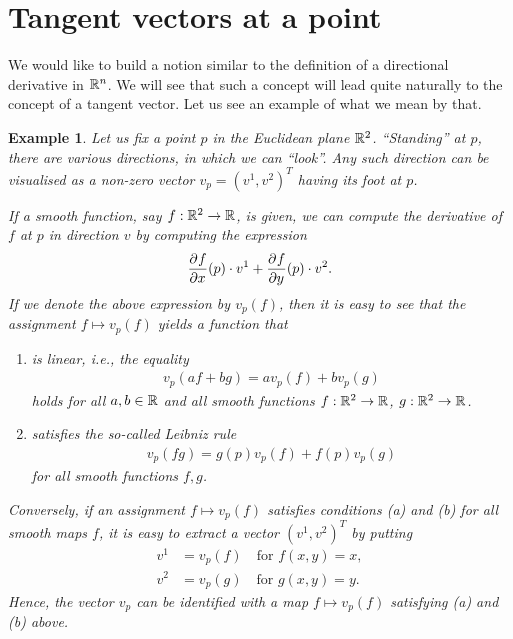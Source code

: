 \documentclass[11pt,a4paper,twoside,openany]{report}
\theoremstyle{my-theorem}
\theoremstyle{non-theorem}
\newtheorem{example}[theorem]{Example}
\begin{document}
	\section{Tangent vectors at a point}
	\label{sec:tangent-vectors-at-a-point}
	
		We would like to build a notion similar to the definition of a directional derivative in ${\mathbb R}^n$. We will see that such a concept will lead quite naturally to the concept of a tangent vector. Let us see an example of what we mean by that.
		
		\begin{example}
			\label{ex:tangent-vectors-at-a-point-introduction}
			Let us fix a point $p$ in the Euclidean plane ${\mathbb R}^2$. ``Standing'' at $p$, there are various directions, in which we can ``look''. Any such direction can be visualised as a non-zero vector $v_p = (v^1, v^2)^T$ having its foot at $p$.
			
			If a smooth function, say $f: {\mathbb R}^2 \to {\mathbb R}$, is given, we can compute the derivative of $f$ at $p$ in direction $v$ by computing the expression
			\begin{align*}
				\frac{\partial^{} f}{\partial x^{}}(p) \cdot v^1 + \frac{\partial^{} f}{\partial y^{}}(p) \cdot v^2.
			\end{align*}
			If we denote the above expression by $v_p(f)$, then it is easy to see that the assignment $f \mapsto v_p(f)$ yields a function that
			\begin{enumerate}[label=\rm(\alph*)]
				\item is linear, i.e., the equality
				\begin{align*}
					v_p(af+bg) = av_p(f) + bv_p(g)
				\end{align*}
				holds for all $a,b \in {\mathbb R}$ and all smooth functions $f: {\mathbb R}^2 \to {\mathbb R}$, $g: {\mathbb R}^2 \to {\mathbb R}$.
				
				\item satisfies the so-called \emph{Leibniz rule}
				\begin{align*}
					v_p(fg) = g(p) v_p(f) + f(p) v_p(g)
				\end{align*}
				for all smooth functions $f,g$.
			\end{enumerate}
		
			Conversely, if an assignment $f \mapsto v_p(f)$ satisfies conditions (a) and (b) for all smooth maps $f$, it is easy to extract a vector $(v^1,v^2)^T$ by putting
			\begin{align*}
				v^1 &= v_p(f) \quad \text{for } f(x,y) = x,
			\\
				v^2 &= v_p(g) \quad \text{for } g(x,y) = y.
			\end{align*}
			Hence, the vector $v_p$ can be identified with a map $f \mapsto v_p(f)$ satisfying (a) and (b) above.
		\end{example}
		
\end{document}
